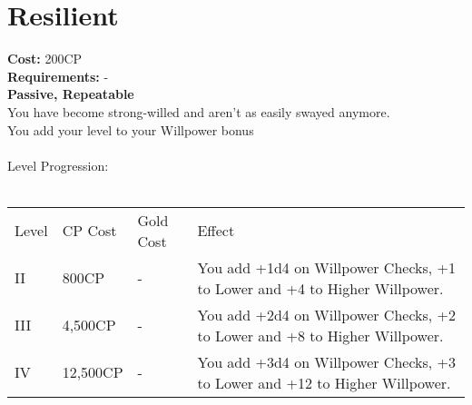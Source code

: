 \section{Resilient}\label{perk:resilient}
\textbf{Cost:} 200CP\\
\textbf{Requirements:} -\\
\textbf{Passive, Repeatable}\\
You have become strong-willed and aren't as easily swayed anymore.\\
You add your level to your Willpower bonus\\
\\
Level Progression:\\
\\
\begin{tabular}{l | l | l | l}
	Level & CP Cost & Gold Cost & Effect\\
	II & 800CP & - & You add +1d4 on Willpower Checks, +1 to Lower and +4 to Higher Willpower.\\
	III & 4,500CP & - & You add +2d4 on Willpower Checks, +2 to Lower and +8 to Higher Willpower.\\
	IV & 12,500CP & - & You add +3d4 on Willpower Checks, +3 to Lower and +12 to Higher Willpower.\\
\end{tabular}

